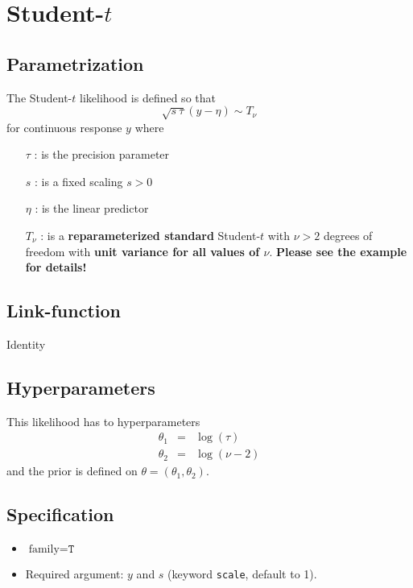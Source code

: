\documentclass[a4paper,11pt]{article}
\begin{document}
\section*{Student-$t$}

\subsection*{Parametrization}

The Student-$t$ likelihood is defined so that 
\[
\sqrt{s\ \tau}(y - \eta)\sim T_{\nu}
\]
for continuous response $y$ where
\begin{itemize}
\item[$\tau$]: is the precision parameter
\item[$s$]: is a fixed scaling $s>0$
\item[$\eta$]: is the linear predictor
\item[$T_{\nu}$]: is a \textbf{reparameterized standard} Student-$t$
    with $\nu>2$ degrees of freedom with \textbf{unit variance for all
        values of $\nu$}. \textbf{Please see the example for details!}
\end{itemize}

\subsection*{Link-function}

Identity

\subsection*{Hyperparameters}

This likelihood has to hyperparameters
\begin{eqnarray*}
    \theta_1 &=& \log(\tau)\\
    \theta_2&=&\log(\nu-2)
\end{eqnarray*}
and the prior is defined on $\theta=(\theta_1,\theta_2)$. 

\subsection*{Specification}

\begin{itemize}
\item $\text{family}=\texttt{T}$
\item Required argument: $y$ and $s$ (keyword {\tt scale}, default
    to 1).
\end{itemize}
\end{document}
